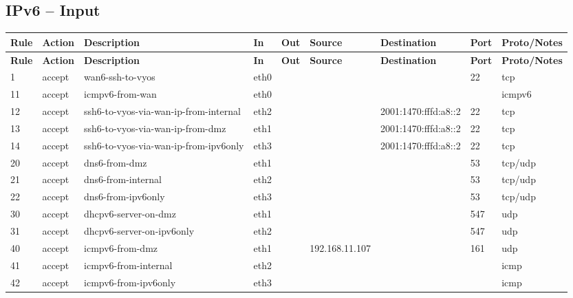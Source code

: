 \documentclass[a4paper,11pt]{article}
\begin{document}
\begin{landscape}
\subsection{IPv6 -- Input}
\begin{longtable}{|l|l|l|l|l|l|l|p{2.2cm}|l|}
\hline
\textbf{Rule} & \textbf{Action} & \textbf{Description} & \textbf{In} & \textbf{Out} & \textbf{Source} & \textbf{Destination} & \textbf{Port} & \textbf{Proto/Notes} \\
\hline
\endfirsthead
\hline
\textbf{Rule} & \textbf{Action} & \textbf{Description} & \textbf{In} & \textbf{Out} & \textbf{Source} & \textbf{Destination} & \textbf{Port} & \textbf{Proto/Notes} \\
\hline
\endhead
1 & accept & wan6-ssh-to-vyos & eth0 &  &  &  & 22 & tcp \\
11 & accept & icmpv6-from-wan & eth0 &  &  &  &  & icmpv6 \\
12 & accept & ssh6-to-vyos-via-wan-ip-from-internal & eth2 &  &  & 2001:1470:fffd:a8::2 & 22 & tcp \\
13 & accept & ssh6-to-vyos-via-wan-ip-from-dmz & eth1 &  &  & 2001:1470:fffd:a8::2 & 22 & tcp \\
14 & accept & ssh6-to-vyos-via-wan-ip-from-ipv6only & eth3 &  &  & 2001:1470:fffd:a8::2 & 22 & tcp \\
20 & accept & dns6-from-dmz & eth1 &  &  &  & 53 & tcp/udp \\
21 & accept & dns6-from-internal & eth2 &  &  &  & 53 & tcp/udp \\
22 & accept & dns6-from-ipv6only & eth3 &  &  &  & 53 & tcp/udp \\
30 & accept & dhcpv6-server-on-dmz & eth1 &  &  &  & 547 & udp \\
31 & accept & dhcpv6-server-on-ipv6only & eth2 &  &  &  & 547 & udp \\
40 & accept & icmpv6-from-dmz & eth1 &  & 192.168.11.107 & & 161 & udp \\
41 & accept & icmpv6-from-internal & eth2 &  &  &  &  & icmp \\
42 & accept & icmpv6-from-ipv6only & eth3 &  &  &  &  & icmp \\
\hline
\end{longtable}


\end{landscape}
\end{document}
